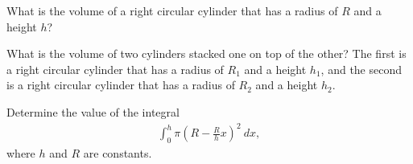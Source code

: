 
\begin{problem}
  \item What is the volume of a right circular cylinder that has a radius of $R$ and a height $h$?

    \vspace{3em}

  \item What is the volume of two cylinders stacked one on top of the other?
    The first is a right circular cylinder that has a radius of $R_1$ and a height $h_1$,
    and the second is a right circular cylinder that has a radius of $R_2$ and a height
    $h_2$.

    \vspace{3em}

\item Determine the value of the integral
  \begin{eqnarray*}
    \int^h_0 \pi \left (R-\frac{R}{h} x\right)^2 ~ dx,
  \end{eqnarray*}
  where $h$ and $R$ are constants.
  \vfill

\end{problem}


